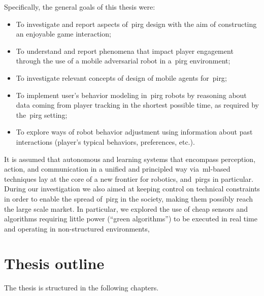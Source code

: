 Specifically, the general goals of this thesis were:

\begin{itemize}
\item To investigate and report aspects of~\gls{pirg} design with the aim of constructing an enjoyable game interaction; 
\item To understand and report phenomena that impact player engagement through the use of a mobile adversarial robot in a~\gls{pirg} environment;
\item To investigate relevant concepts of design of mobile agents for~\gls{pirg};
\item To implement user's behavior modeling in~\gls{pirg} robots by reasoning about data coming from player tracking in the shortest possible time, as required by the~\gls{pirg} setting;
\item To explore ways of robot behavior adjustment using information about past interactions (player's typical behaviors, preferences, etc.).
\end{itemize}

It is assumed that autonomous and learning systems that encompass perception, action, and communication in a unified and principled way via~\gls{ml}-based techniques lay at the core of a new frontier for robotics, and~\gls{pirg}s in particular. During our investigation we also aimed at keeping control on technical constraints in order to enable the spread of~\gls{pirg} in the society, making them possibly reach the large scale market. In particular, we explored the use of cheap sensors and algorithms requiring little power (``green algorithms'') to be executed in real time and operating in non-structured environments, 

\section{Thesis outline}
The thesis is structured in the following chapters.


